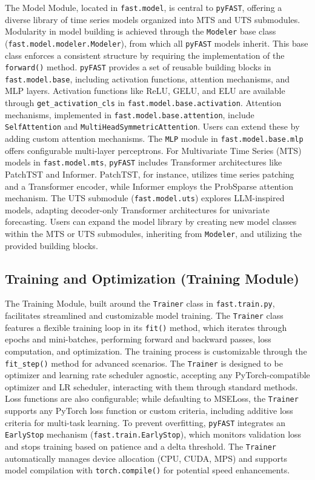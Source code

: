 \documentclass[twoside,11pt]{article}
\begin{document}
The Model Module, located in \texttt{fast.model}, is central to \texttt{pyFAST}, offering a diverse library of time series models organized into MTS and UTS submodules.  Modularity in model building is achieved through the \texttt{Modeler} base class (\texttt{fast.model.modeler.Modeler}), from which all \texttt{pyFAST} models inherit. This base class enforces a consistent structure by requiring the implementation of the \texttt{forward()} method.  \texttt{pyFAST} provides a set of reusable building blocks in \texttt{fast.model.base}, including activation functions, attention mechanisms, and MLP layers. Activation functions like ReLU, GELU, and ELU are available through \texttt{get\_activation\_cls} in \texttt{fast.model.base.activation}. Attention mechanisms, implemented in \texttt{fast.model.base.attention}, include \texttt{SelfAttention} and \texttt{MultiHeadSymmetric\-Attention}.  Users can extend these by adding custom attention mechanisms.  The \texttt{MLP} module in \texttt{fast.model.base.mlp} offers configurable multi-layer perceptrons. For Multivariate Time Series (MTS) models in \texttt{fast.model.mts}, \texttt{pyFAST} includes Transformer architectures like PatchTST and Informer. PatchTST, for instance, utilizes time series patching and a Transformer encoder, while Informer employs the ProbSparse attention mechanism.  The UTS submodule (\texttt{fast.model.uts}) explores LLM-inspired models, adapting decoder-only Transformer architectures for univariate forecasting.  Users can expand the model library by creating new model classes within the MTS or UTS submodules, inheriting from \texttt{Modeler}, and utilizing the provided building blocks.

\subsection{Training and Optimization (Training Module)}

The Training Module, built around the \texttt{Trainer} class in \texttt{fast.train.py}, facilitates streamlined and customizable model training. The \texttt{Trainer} class features a flexible training loop in its \texttt{fit()} method, which iterates through epochs and mini-batches, performing forward and backward passes, loss computation, and optimization. The training process is customizable through the \texttt{fit\_step()} method for advanced scenarios.  The \texttt{Trainer} is designed to be optimizer and learning rate scheduler agnostic, accepting any PyTorch-compatible optimizer and LR scheduler, interacting with them through standard methods.  Loss functions are also configurable; while defaulting to MSELoss, the \texttt{Trainer} supports any PyTorch loss function or custom criteria, including additive loss criteria for multi-task learning.  To prevent overfitting, \texttt{pyFAST} integrates an \texttt{EarlyStop} mechanism (\texttt{fast.train.EarlyStop}), which monitors validation loss and stops training based on patience and a delta threshold.  The \texttt{Trainer} automatically manages device allocation (CPU, CUDA, MPS) and supports model compilation with \texttt{torch.compile()} for potential speed enhancements.
\end{document}
